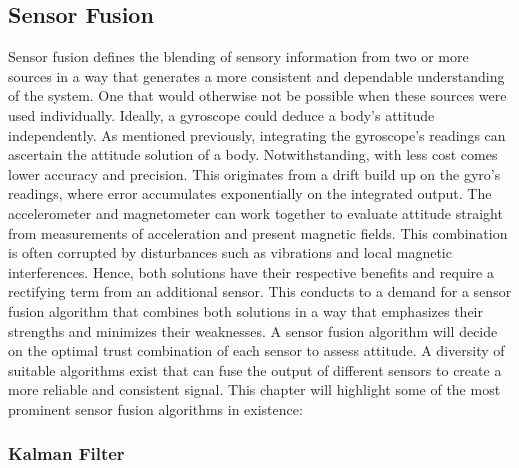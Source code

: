 \subsection{Sensor Fusion}
Sensor fusion defines the blending of sensory information from two or more sources in a way that generates a more consistent and dependable understanding of the system. One that would otherwise not be possible when these sources were used individually. Ideally, a gyroscope could deduce a body’s attitude independently. As mentioned previously, integrating the gyroscope’s readings can ascertain the attitude solution of a body. Notwithstanding, with less cost comes lower accuracy and precision. This originates from a drift build up on the gyro’s readings, where error accumulates exponentially on the integrated output. The accelerometer and magnetometer can work together to evaluate attitude straight from measurements of acceleration and present magnetic fields. This combination is often corrupted by disturbances such as vibrations and local magnetic interferences. Hence, both solutions have their respective benefits and require a rectifying term from an additional sensor. This conducts to a demand for a sensor fusion algorithm that combines both solutions in a way that emphasizes their strengths and minimizes their weaknesses. A sensor fusion algorithm will decide on the optimal trust combination of each sensor to assess attitude. A diversity of suitable algorithms exist that can fuse the output of different sensors to create a more reliable and consistent signal. This chapter will highlight some of the most prominent sensor fusion algorithms in existence:
\subsubsection{Kalman Filter}

